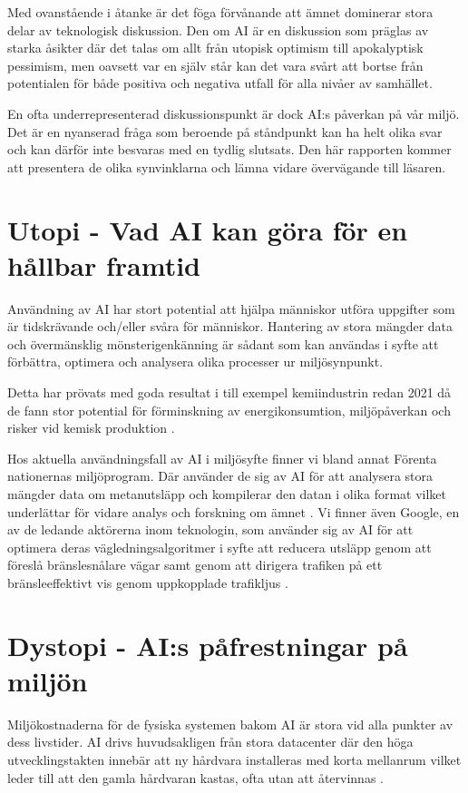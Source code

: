 \documentclass[conference]{IEEEtran}
\begin{document}
Med ovanstående i åtanke är det föga förvånande att ämnet dominerar stora delar av teknologisk diskussion. Den om AI är en diskussion som präglas av starka åsikter där det talas om allt från utopisk optimism till apokalyptisk pessimism, men oavsett var en själv står kan det vara svårt att bortse från potentialen för både positiva och negativa utfall för alla nivåer av samhället. 

En ofta underrepresenterad diskussionspunkt är dock AI:s påverkan på vår miljö. Det är en nyanserad fråga som beroende på ståndpunkt kan ha helt olika svar och kan därför inte besvaras med en tydlig slutsats. Den här rapporten kommer att presentera de olika synvinklarna och lämna vidare övervägande till läsaren. 

\section{Utopi - Vad AI kan göra för en hållbar framtid}

Användning av AI har stort potential att hjälpa människor utföra uppgifter som är tidskrävande och/eller svåra för människor. Hantering av stora mängder data \cite{b4} och övermänsklig mönsterigenkänning \cite{b5} är sådant som kan användas i syfte att förbättra, optimera och analysera olika processer ur miljösynpunkt.  

Detta har prövats med goda resultat i till exempel kemiindustrin redan 2021 då de fann stor potential för förminskning av energikonsumtion, miljöpåverkan och risker vid kemisk produktion \cite{b6}.

Hos aktuella användningsfall av AI i miljösyfte finner vi bland annat Förenta nationernas miljöprogram. Där använder de sig av AI för att analysera stora mängder data om metanutsläpp och kompilerar den datan i olika format vilket underlättar för vidare analys och forskning om ämnet \cite{b7}. Vi finner även Google, en av de ledande aktörerna inom teknologin, som använder sig av AI för att optimera deras vägledningsalgoritmer i syfte att reducera utsläpp genom att föreslå bränslesnålare vägar samt genom att dirigera trafiken på ett bränsleeffektivt vis genom uppkopplade trafikljus \cite{b8}. 

\section{Dystopi - AI:s påfrestningar på miljön}

Miljökostnaderna för de fysiska systemen bakom AI är stora vid alla punkter av dess livstider. AI drivs huvudsakligen från stora datacenter där den höga utvecklingstakten innebär att ny hårdvara installeras med korta mellanrum vilket leder till att den gamla hårdvaran kastas, ofta utan att återvinnas \cite{b9}.
\end{document}
